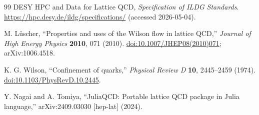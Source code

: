 \documentclass[uplatex,dvipdfmx,ja=standard,11pt,a4paper]{bxjsarticle}
\newcommand{\doi}[1]{\href{https://doi.org/#1}{doi:#1}}
\begin{document}
\begin{thebibliography}{99}
DESY HPC and Data for Lattice QCD,
\textit{Specification of ILDG Standards}.
\url{https://hpc.desy.de/ildg/specifications/} (accessed 2026-05-04).

M. L\"uscher,
``Properties and uses of the Wilson flow in lattice QCD,''
\textit{Journal of High Energy Physics} \textbf{2010}, 071 (2010).
\doi{10.1007/JHEP08(2010)071}; arXiv:1006.4518.

K. G. Wilson,
``Confinement of quarks,''
\textit{Physical Review D} \textbf{10}, 2445--2459 (1974).
\doi{10.1103/PhysRevD.10.2445}.

Y. Nagai and A. Tomiya,
``JuliaQCD: Portable lattice QCD package in Julia language,''
arXiv:2409.03030 [hep-lat] (2024).
\end{thebibliography}
\end{document}
